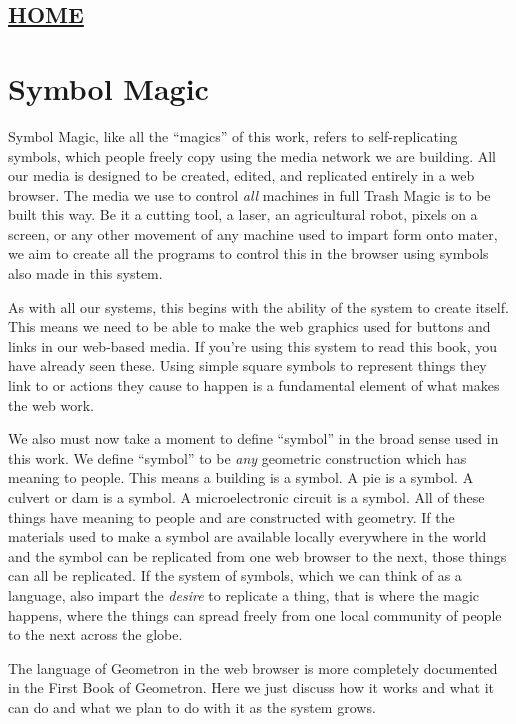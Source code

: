\hypertarget{home}{%
\subsection{\texorpdfstring{\href{scrolls/home}{HOME}}{HOME}}\label{home}}

\hypertarget{symbol-magic}{%
\section{Symbol Magic}\label{symbol-magic}}

Symbol Magic, like all the ``magics'' of this work, refers to
self-replicating symbols, which people freely copy using the media
network we are building. All our media is designed to be created,
edited, and replicated entirely in a web browser. The media we use to
control \emph{all} machines in full Trash Magic is to be built this way.
Be it a cutting tool, a laser, an agricultural robot, pixels on a
screen, or any other movement of any machine used to impart form onto
mater, we aim to create all the programs to control this in the browser
using symbols also made in this system.

As with all our systems, this begins with the ability of the system to
create itself. This means we need to be able to make the web graphics
used for buttons and links in our web-based media. If you're using this
system to read this book, you have already seen these. Using simple
square symbols to represent things they link to or actions they cause to
happen is a fundamental element of what makes the web work.

We also must now take a moment to define ``symbol'' in the broad sense
used in this work. We define ``symbol'' to be \emph{any} geometric
construction which has meaning to people. This means a building is a
symbol. A pie is a symbol. A culvert or dam is a symbol. A
microelectronic circuit is a symbol. All of these things have meaning to
people and are constructed with geometry. If the materials used to make
a symbol are available locally everywhere in the world and the symbol
can be replicated from one web browser to the next, those things can all
be replicated. If the system of symbols, which we can think of as a
language, also impart the \emph{desire} to replicate a thing, that is
where the magic happens, where the things can spread freely from one
local community of people to the next across the globe.

The language of Geometron in the web browser is more completely
documented in the First Book of Geometron. Here we just discuss how it
works and what it can do and what we plan to do with it as the system
grows.

